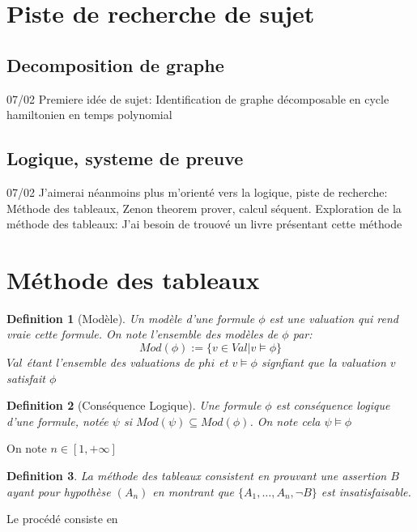 \documentclass{paper}
\newtheorem{defi}{Definition}
\begin{document}
\setlength{\headheight}{13.07225pt}
\addtolength{\topmargin}{-1.07225pt}



\section*{Piste de recherche de sujet}
\subsection*{Decomposition de graphe}
07/02
Premiere idée de sujet: Identification de graphe décomposable en cycle hamiltonien en temps polynomial

\subsection*{Logique, systeme de preuve}
07/02
J'aimerai néanmoins plus m'orienté vers la logique, piste de recherche: Méthode des tableaux, Zenon theorem prover, calcul séquent.
Exploration de la méthode des tableaux: J'ai besoin de trouové un livre présentant cette méthode

\section*{Méthode des tableaux}

\begin{defi}[Modèle]
    Un \textit{modèle} d'une formule $\phi$ est une valuation qui rend vraie cette formule. On note l'ensemble des modèles de $\phi$ par:
    $$Mod(\phi) := \{v\in Val | v \vDash \phi\}$$
    $Val$ étant l'ensemble des valuations de $phi$ et $v \vDash \phi$ signfiant que la valuation $v$ satisfait $\phi$
\end{defi}
\begin{defi}[Conséquence Logique]
    Une formule $\phi$ est \textit{conséquence logique} d'une formule, notée $\psi$ si $Mod(\psi) \subseteq Mod(\phi)$. On note cela $\psi \vDash \phi$
\end{defi}
On note $n\in [ 1,+\infty ] $
\begin{defi}
    \textit{La méthode des tableaux} consistent en prouvant une assertion $B$ ayant pour hypothèse $(A_n)$ en montrant
    que $\{A_1,\dots,A_n, \lnot B\}$ est insatisfaisable.
\end{defi}

Le procédé consiste en 
\end{document}
